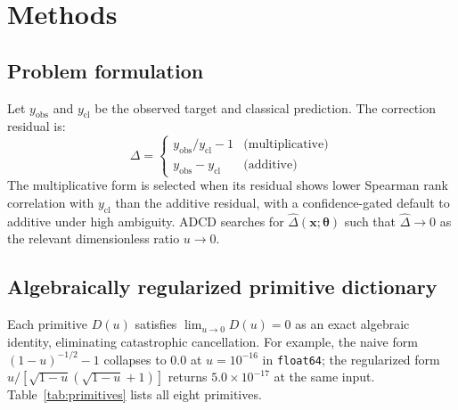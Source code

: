 \documentclass{article}
\begin{document}
\section{Methods}

\subsection{Problem formulation}

Let $y_\mathrm{obs}$ and $y_\mathrm{cl}$ be the observed target and classical
prediction. The correction residual is:
\begin{equation}
  \Delta =
  \begin{cases}
    y_\mathrm{obs}/y_\mathrm{cl} - 1 & \text{(multiplicative)} \\
    y_\mathrm{obs} - y_\mathrm{cl}   & \text{(additive)}
  \end{cases}
\end{equation}
The multiplicative form is selected when its residual shows lower Spearman rank
correlation with $y_\mathrm{cl}$ than the additive residual, with a
confidence-gated default to additive under high ambiguity.
ADCD searches for $\hat{\Delta}(\mathbf{x};\boldsymbol{\theta})$ such that
$\hat{\Delta}\to0$ as the relevant dimensionless ratio $u\to0$.

\subsection{Algebraically regularized primitive dictionary}

Each primitive $D(u)$ satisfies $\lim_{u\to 0} D(u) = 0$ as an exact algebraic
identity, eliminating catastrophic cancellation.
For example, the naive form $(1-u)^{-1/2}-1$ collapses to $0.0$ at
$u=10^{-16}$ in \texttt{float64}; the regularized form
$u/[\sqrt{1-u}(\sqrt{1-u}+1)]$ returns $5.0\times10^{-17}$ at the same input.
Table~\ref{tab:primitives} lists all eight primitives.
\end{document}
